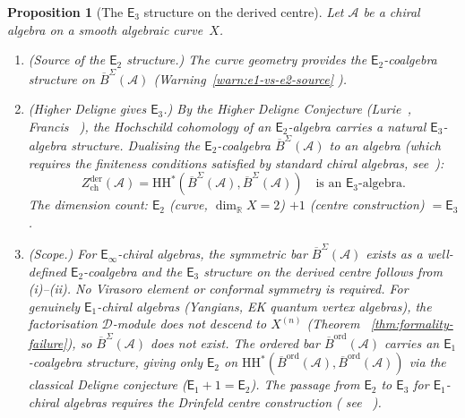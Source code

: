 \documentclass[11pt,reqno]{amsart}
\newtheorem{proposition}[theorem]{Proposition}
\theoremstyle{definition}
\theoremstyle{remark}
\newcommand{\cA}{\mathcal{A}}
\newcommand{\cD}{\mathcal{D}}
\newcommand{\HH}{\mathrm{HH}}
\newcommand{\Eone}{\mathsf{E}_{1}}
\newcommand{\Etwo}{\mathsf{E}_{2}}
\newcommand{\Ethree}{\mathsf{E}_{3}}
\newcommand{\Einf}{\mathsf{E}_{\infty}}
\newcommand{\Barord}{\overline{B}^{\mathrm{ord}}}
\newcommand{\BarSig}{\overline{B}^{\Sigma}}
\newcommand{\RR}{\mathbb{R}}
\numberwithin{equation}{section}
\begin{document}
\begin{proposition}[The $\Ethree$ structure on the
derived centre]
\label{prop:e3-structure}
Let $\cA$ be a chiral algebra on a smooth algebraic
curve~$X$.
\begin{enumerate}[label=\textup{(\roman*)}]
\item \textup{(Source of the $\Etwo$ structure.)}
  The curve geometry provides the $\Etwo$-coalgebra
  structure on $\BarSig(\cA)$
  \textup{(}Warning~\textup{\ref{warn:e1-vs-e2-source}}%
  \textup{)}.
\item \textup{(Higher Deligne gives $\Ethree$.)}
  By the Higher Deligne Conjecture
  \textup{(}Lurie~\cite{HA}, Francis~\cite{Francis2013}%
  \textup{)}, the Hochschild cohomology of an
  $\Etwo$-algebra carries a natural $\Ethree$-algebra
  structure. Dualising the $\Etwo$-coalgebra
  $\BarSig(\cA)$ to an algebra
  \textup{(}which requires the finiteness conditions
  satisfied by standard chiral algebras,
  see~\cite[Thm~A]{Lorgat26I}\textup{)}:
  \begin{equation}\label{eq:e3-hdc}
    Z^{\mathrm{der}}_{\mathrm{ch}}(\cA)
    = \HH^*(\BarSig(\cA), \BarSig(\cA))
    \quad \text{is an $\Ethree$-algebra.}
  \end{equation}
  The dimension count: $\Etwo$ \textup{(}curve,
  $\dim_{\RR} X = 2$\textup{)} $+ 1$
  \textup{(}centre construction\textup{)} $= \Ethree$.
\item \textup{(Scope.)} For $\Einf$-chiral algebras, the
  symmetric bar $\BarSig(\cA)$ exists as a well-defined
  $\Etwo$-coalgebra and the $\Ethree$ structure on
  the derived centre follows from \textup{(i)--(ii)}.
  No Virasoro element or conformal symmetry is required.
  For genuinely $\Eone$-chiral algebras
  \textup{(}Yangians, EK quantum vertex algebras\textup{)},
  the factorisation $\cD$-module does not descend to
  $X^{(n)}$ \textup{(}Theorem~%
  \textup{\ref{thm:formality-failure}}\textup{)},
  so $\BarSig(\cA)$ does not exist. The ordered bar
  $\Barord(\cA)$ carries an $\Eone$-coalgebra structure,
  giving only $\Etwo$ on
  $\HH^*(\Barord(\cA), \Barord(\cA))$
  via the classical Deligne conjecture
  \textup{(}$\Eone + 1 = \Etwo$\textup{)}.
  The passage from $\Etwo$ to $\Ethree$ for $\Eone$-chiral
  algebras requires the Drinfeld centre construction
  \textup{(}%
  see~\cite[conj:drinfeld-center-equals-bulk]{Lorgat26III}%
  \textup{)}.
\end{enumerate}
\end{proposition}
\end{document}

